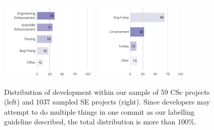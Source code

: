\documentclass[conference,10pt]{IEEEtran}
\begin{document}
\begin{figure}[!t]
\vspace{-20pt}
\begin{center}
\hspace{-8mm} \includegraphics[width=1.85in, height=1.5in]{img/csc_development.png}
\hspace{-2mm}\includegraphics[width=1.85in, height=1.5in]{img/se_development.png}
 
\end{center}
\vspace{-17pt}
\caption{Distribution of development within our sample of 59 CSc projects (left) and 1037 sampled SE projects (right). Since developers may attempt to do multiple things in one commit as our labelling guideline described, the total distribution is more than 100\%.}
\label{fig:SE_activities}
\vspace{-10pt}
\end{figure}
\end{document}
